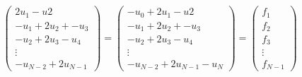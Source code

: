 \begin{align*}
    \begin{pmatrix}
        2u_1 - u2 \\
        -u_1 + 2u_2 + -u_3 \\
        -u_2 + 2 u_3 - u_4 \\
        \vdots \\
        -u_{N-2} + 2 u_{N - 1}
    \end{pmatrix}
    =
    \begin{pmatrix}
        -u_0 + 2u_1 - u2 \\
        -u_1 + 2u_2 + -u_3 \\
        -u_2 + 2 u_3 - u_4 \\
        \vdots \\
        -u_{N-2} + 2 u_{N - 1} - u_N
    \end{pmatrix}
    =
    \begin{pmatrix}
        f_1 \\
        f_2 \\
        f_3 \\
        \vdots \\
        f_{N-1}
    \end{pmatrix}
\end{align*}
